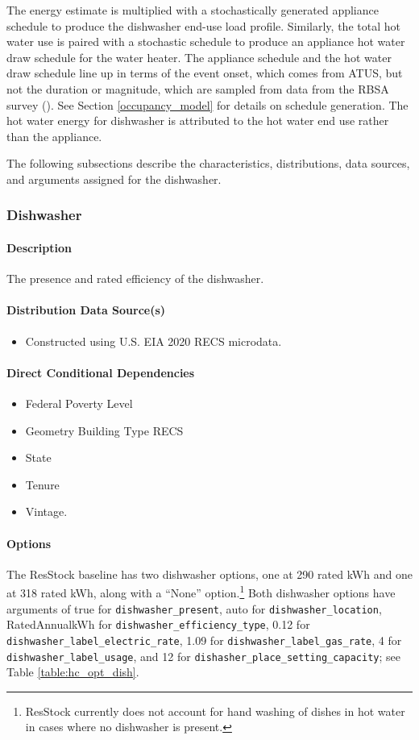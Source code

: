 The energy estimate is multiplied with a stochastically generated appliance schedule to produce the dishwasher end-use load profile. Similarly, the total hot water use is paired with a stochastic schedule to produce an appliance hot water draw schedule for the water heater. The appliance schedule and the hot water draw schedule line up in terms of the event onset, which comes from ATUS, but not the duration or magnitude, which are sampled from data from the RBSA survey (\cite{RBSA}). See Section \ref{occupancy_model} for details on schedule generation. The hot water energy for dishwasher is attributed to the hot water end use rather than the appliance.

The following subsections describe the characteristics, distributions, data sources, and arguments assigned for the dishwasher.

\subsubsection{Dishwasher}
\paragraph{Description}
The presence and rated efficiency of the dishwasher.

\paragraph{Distribution Data Source(s)}
\begin{itemize}
\item Constructed using U.S. EIA 2020 RECS microdata. 
\end{itemize}

\paragraph{Direct Conditional Dependencies}
\begin{itemize}
    \item Federal Poverty Level
    \item Geometry Building Type RECS
    \item State
    \item Tenure
    \item Vintage.
\end{itemize}

\paragraph{Options}
The ResStock baseline has two dishwasher options, one at 290 rated kWh and one at 318 rated kWh, along with a ``None'' option.\footnote{ResStock currently does not account for hand washing of dishes in hot water in cases where no dishwasher is present.} Both dishwasher options have arguments of true for \texttt{dishwasher\_present}, auto for \texttt{dishwasher\_location}, RatedAnnualkWh for \texttt{dishwasher\_efficiency\_type}, 0.12 for \texttt{dishwasher\_label\_electric\_rate}, 1.09 for \texttt{dishwasher\_label\_gas\_rate}, 4 for \texttt{dishwasher\_label\_usage}, and 12 for \texttt{dishasher\_place\_setting\_capacity};  see Table \ref{table:hc_opt_dish}. 

